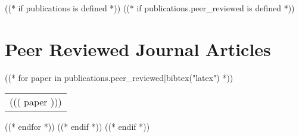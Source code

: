 \documentclass[a4paper, oneside, final]{scrartcl} %
\begin{document}
\begin{center}

((* if publications is defined *))
((* if publications.peer_reviewed is defined *))
\section{Peer Reviewed Journal Articles}

((* for paper in publications.peer_reviewed|bibtex("latex") *))
\begin{tabularx}{0.97\linewidth}{X}
((( paper )))
\end{tabularx}

\vspace{6pt}
((* endfor *))
((* endif *))
((* endif *))


\end{center}
\end{document}
